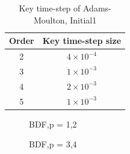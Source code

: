 \documentclass[a4paper,twocolumn]{article}
\theoremstyle{definition}
\begin{document}
\begin{table}[!htp]
	\centering
	\begin{tabular}{|c|c|}
		\hline	
		Order & Key time-step size  \\
		\hline		
		2 & $4\times 10^{-4}$ \\	
		\hline		
		3 & $1\times 10^{-3}$   \\	
		\hline 
		4 & $2\times 10^{-3}$  \\
		\hline
		5 & $1\times 10^{-3}$  \\
		\hline
	\end{tabular}
	\caption{Key time-step of Adams-Moulton, Initial1}
	\label{tab:test32}
\end{table}
\begin{figure}[!htp] 
	\centering
	\caption{BDF,p = 1,2 }
	\label{BDF1ks}
\end{figure}
\begin{figure}[!htp] 
	\centering
	\caption{BDF,p = 3,4 }
	\label{BDF2ks}
\end{figure}
\end{document}
